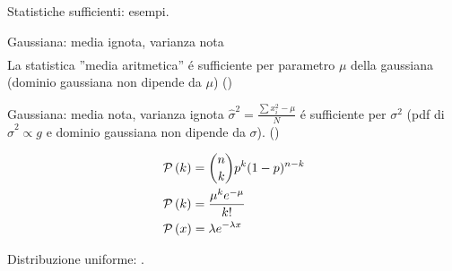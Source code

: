 \begin{wordonframe}{Statistiche sufficienti: esempi.}
\begin{block}{Gaussiana: media ignota, varianza nota}
\begin{align*}
\end{align*}
La statistica ''media aritmetica'' \'e sufficiente per parametro $\mu$ della gaussiana (dominio gaussiana non dipende da $\mu$) ()
\end{block}
\begin{block}{Gaussiana: media nota, varianza ignota}
$\hat{\sigma}^2=\frac{\sum x_i^2-\mu}{N}$ \'e sufficiente per $\sigma^2$ (pdf di $\hat{\sigma}^2\propto g$ e dominio gaussiana non dipende da $\sigma$). ()
\end{block}
\begin{block}{}
\begin{align*}
&\operatorname{\mathcal{P}}{(k)}=\binom{n}{k}p^k(1-p)^{n-k}\\
&\operatorname{\mathcal{P}}{(k)}=\frac{\mu^ke^{-\mu}}{k!}\\
&\operatorname{\mathcal{P}}{(x)}=\lambda e^{-\lambda x}
\end{align*}
\end{block}
\begin{block}{Distribuzione uniforme: .}
\begin{columns}[T]
\begin{column}{0.5\textwidth}


\end{column}
\end{columns}
\end{block}
\end{wordonframe}
